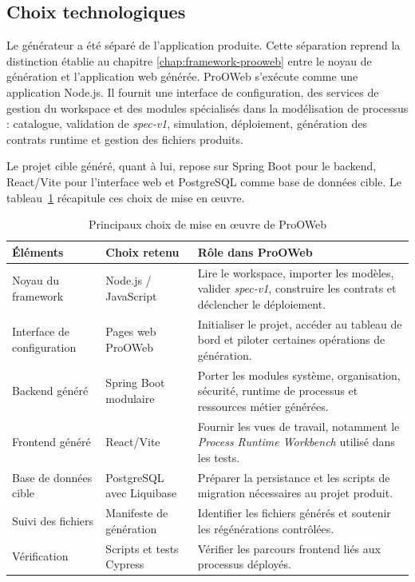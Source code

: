 \subsection{Choix technologiques}

Le générateur a été séparé de l'application produite. Cette séparation reprend la distinction établie au chapitre \ref{chap:framework-prooweb} entre le noyau de génération et l'application web générée. ProOWeb s'exécute comme une application Node.js. Il fournit une interface de configuration, des services de gestion du workspace et des modules spécialisés dans la modélisation de processus : catalogue, validation de \textit{spec-v1}, simulation, déploiement, génération des contrats runtime et gestion des fichiers produits.

Le projet cible généré, quant à lui, repose sur Spring Boot pour le backend,
React/Vite pour l'interface web et PostgreSQL comme base de données cible. Le
tableau~\ref{tab:chap4-choix-techniques} récapitule ces choix de mise en œuvre.

\begin{table}[H]
\centering
\caption{Principaux choix de mise en œuvre de ProOWeb}
\label{tab:chap4-choix-techniques}
\begin{tabularx}{\textwidth}{p{3.0cm}p{3.3cm}X}
\toprule
\textbf{Éléments} & \textbf{Choix retenu} & \textbf{Rôle dans ProOWeb} \\
\midrule
Noyau du framework & Node.js / JavaScript & Lire le workspace, importer les modèles, valider \textit{spec-v1}, construire les contrats et déclencher le déploiement. \\
Interface de configuration & Pages web ProOWeb & Initialiser le projet, accéder au tableau de bord et piloter certaines opérations de génération. \\
Backend généré & Spring Boot modulaire & Porter les modules système, organisation, sécurité, runtime de processus et ressources métier générées. \\
Frontend généré & React/Vite & Fournir les vues de travail, notamment le \textit{Process Runtime Workbench} utilisé dans les tests. \\
Base de données cible & PostgreSQL avec Liquibase & Préparer la persistance et les scripts de migration nécessaires au projet produit. \\
Suivi des fichiers & Manifeste de génération & Identifier les fichiers générés et soutenir les régénérations contrôlées. \\
Vérification & Scripts et tests Cypress & Vérifier les parcours frontend liés aux processus déployés. \\
\bottomrule
\end{tabularx}
\end{table}


